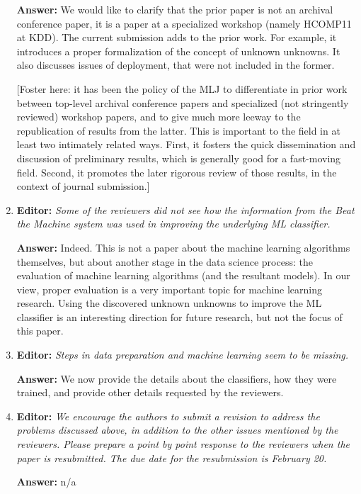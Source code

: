 \documentclass[letterpaper]{article}
\begin{document}
\begin{enumerate}
\textbf{Answer:} We would like to clarify that the prior paper is not an archival conference paper, it is a paper at a specialized workshop (namely HCOMP11 at KDD). The current submission adds to the prior work.  For example, it introduces a proper formalization of the concept of unknown unknowns.  It also discusses issues of deployment, that were not included in the former. 

[Foster here: it has been the policy of the MLJ to differentiate in prior work between top-level archival conference papers and specialized (not stringently reviewed) workshop papers, and to give much more leeway to the republication of results from the latter.  This is important to the field in at least two intimately related ways.  First, it fosters the quick dissemination and discussion of preliminary results, which is generally good for a fast-moving field.  Second, it promotes the later rigorous review of those results, in the context of journal submission.]

\item \textbf{Editor:}  \emph{Some of the reviewers did not see how the information from the Beat the Machine system was used in improving the underlying ML classifier.}

\textbf{Answer:}   Indeed.  This is not a paper about the machine learning algorithms themselves, but about another stage in the data science process: the evaluation of machine learning algorithms (and the resultant models).  In our view, proper evaluation is a very important topic for machine learning research.  Using the discovered unknown unknowns to improve the ML classifier is an interesting direction for future research, but not the focus of this paper. 

\item \textbf{Editor:}  \emph{Steps in data preparation and machine learning seem to be missing.}

\textbf{Answer:} We now provide the details about the classifiers, how they were trained, and provide other details requested by the reviewers.

\item \textbf{Editor:}  \emph{We encourage the authors to submit a revision to address the problems discussed above, in addition to the other issues mentioned by the reviewers. Please prepare a point by point response to the reviewers when the paper is resubmitted. The due date for the resubmission is February 20.}

\textbf{Answer:} n/a



\end{enumerate}
\end{document}
